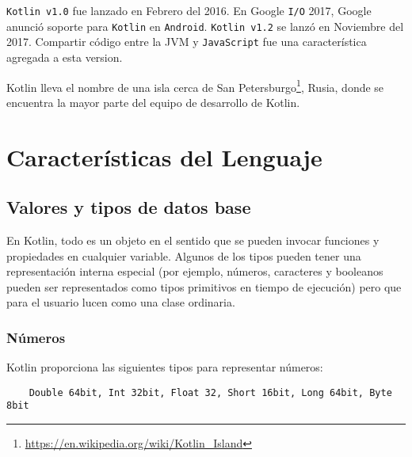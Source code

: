\texttt{Kotlin v1.0} fue lanzado en Febrero del 2016\cite{kotlin-v1}. En Google \texttt{I/O} 2017, Google anunció soporte para \texttt{Kotlin} en \texttt{Android}\cite{kotlin-in-android}. \texttt{Kotlin v1.2} se lanzó en Noviembre del 2017. Compartir código entre la JVM y \texttt{JavaScript} fue una característica agregada a esta version\cite{kotlin-v12}.

Kotlin lleva el nombre de una isla cerca de San Petersburgo\footnote{\url{https://en.wikipedia.org/wiki/Kotlin_Island}}, Rusia, donde se encuentra la mayor parte del equipo de desarrollo de Kotlin\cite{kotlin-in-action}.



\section{Características del Lenguaje}

\subsection{Valores y tipos de datos base}
En Kotlin, todo es un objeto en el sentido que se pueden invocar funciones y propiedades en cualquier variable. Algunos de los tipos pueden tener una representación interna especial (por ejemplo, números, caracteres y booleanos pueden ser representados como tipos primitivos en tiempo de ejecución) pero que para el usuario lucen como una clase ordinaria. 

\subsubsection{Números}
Kotlin proporciona las siguientes tipos para representar números:
\begin{verbatim}
    Double 64bit, Int 32bit, Float 32, Short 16bit, Long 64bit, Byte 8bit
\end{verbatim}


